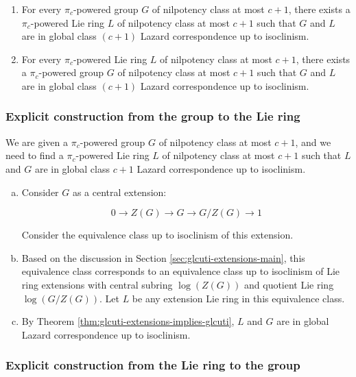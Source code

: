 \begin{enumerate}
\item For every $\pi_c$-powered group $G$ of nilpotency class at most $c
  + 1$, there exists a $\pi_c$-powered Lie ring $L$ of nilpotency class at
  most $c + 1$ such that $G$ and $L$ are in global class $(c + 1)$ Lazard
  correspondence up to isoclinism.
\item For every $\pi_c$-powered Lie ring $L$ of nilpotency class at most
  $c + 1$, there exists a $\pi_c$-powered group $G$ of nilpotency class
  at most $c + 1$ such that $G$ and $L$ are in global class $(c + 1)$ Lazard
  correspondence up to isoclinism.
\end{enumerate}

\subsubsection{Explicit construction from the group to the Lie ring}

We are given a $\pi_c$-powered group $G$ of nilpotency class at most
$c + 1$, and we need to find a $\pi_c$-powered Lie ring $L$ of
nilpotency class at most $c + 1$ such that $L$ and $G$ are in global
class $c + 1$ Lazard correspondence up to isoclinism.

\begin{enumerate}[(a)]
\item Consider $G$ as a central extension:

  $$0 \to Z(G) \to G \to G/Z(G) \to 1$$

  Consider the equivalence class up to isoclinism of this extension.

\item Based on the discussion in Section
  \ref{sec:glcuti-extensions-main}, this equivalence class corresponds
  to an equivalence class up to isoclinism of Lie ring extensions with
  central subring $\log(Z(G))$ and quotient Lie ring
  $\log(G/Z(G))$. Let $L$ be any extension Lie ring in this
  equivalence class.

\item By Theorem \ref{thm:glcuti-extensions-implies-glcuti}, $L$ and $G$
  are in global Lazard correspondence up to isoclinism.
\end{enumerate}

\subsubsection{Explicit construction from the Lie ring to the group}

